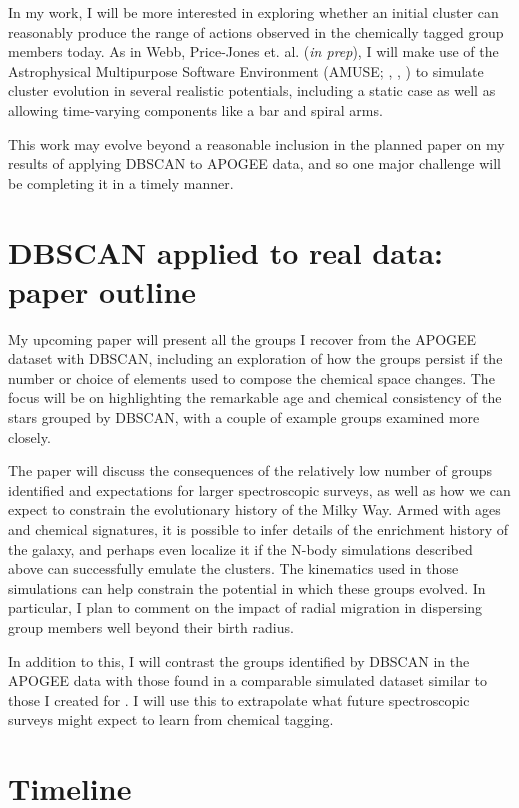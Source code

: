 \documentclass[11pt]{article}
\begin{document}
    In my work, I will be more interested in exploring whether an initial cluster can reasonably produce the range of actions observed in the chemically tagged group members today. As in Webb, Price-Jones et. al. (\emph{in prep}), I will make use of the Astrophysical Multipurpose Software Environment (AMUSE; \citealt{PortegiesZwart13}, \citealt{Pelupessy2013}, \citealt{PortegiesZwart2018}) to simulate cluster evolution in several realistic potentials, including a static case as well as allowing time-varying components like a bar and spiral arms.
    
    This work may evolve beyond a reasonable inclusion in the planned paper on my results of applying DBSCAN to APOGEE data, and so one major challenge will be completing it in a timely manner.
 
\section*{DBSCAN applied to real data: paper outline}

My upcoming paper will present all the groups I recover from the APOGEE dataset with DBSCAN, including an exploration of how the groups persist if the number or choice of elements used to compose the chemical space changes. The focus will be on highlighting the remarkable age and chemical consistency of the stars grouped by DBSCAN, with a couple of example groups examined more closely.

The paper will discuss the consequences of the relatively low number of groups identified and expectations for larger spectroscopic surveys, as well as how we can expect to constrain the evolutionary history of the Milky Way. Armed with ages and chemical signatures, it is possible to infer details of the enrichment history of the galaxy, and perhaps even localize it if the N-body simulations described above can successfully emulate the clusters. The kinematics used in those simulations can help constrain the potential in which these groups evolved. In particular, I plan to comment on the impact of radial migration in dispersing group members well beyond their birth radius.

In addition to this, I will contrast the groups identified by DBSCAN in the APOGEE data with those found in a comparable simulated dataset similar to those I created for \citep{Price-Jones2019}. I will use this to extrapolate what future spectroscopic surveys might expect to learn from chemical tagging.


\section*{Timeline}
\end{document}
